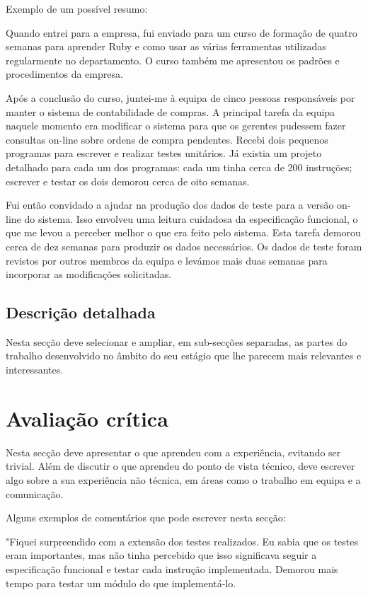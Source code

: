 \documentclass{article}
\begin{document}
Exemplo de um possível resumo:

Quando entrei para a empresa, fui enviado para um curso de formação de quatro semanas para aprender Ruby e como usar as várias ferramentas utilizadas regularmente no departamento. O curso também me apresentou os padrões e procedimentos da empresa.

Após a conclusão do curso, juntei-me à equipa de cinco pessoas responsáveis por manter o sistema de contabilidade de compras. A principal tarefa da equipa naquele momento era modificar o sistema para que os gerentes pudessem fazer consultas on-line sobre ordens de compra pendentes. Recebi dois pequenos programas para escrever e realizar testes unitários. Já existia um projeto detalhado para cada um dos programas: cada um tinha cerca de 200 instruções; escrever e testar os dois demorou cerca de oito semanas.

Fui então convidado a ajudar na produção dos dados de teste para a versão on-line do sistema. Isso envolveu uma leitura cuidadosa da especificação funcional, o que me levou a perceber melhor o que era feito pelo sistema. Esta tarefa demorou cerca de dez semanas para produzir os dados necessários. Os dados de teste foram revistos por outros membros da equipa e levámos mais duas semanas para incorporar as modificações solicitadas.

\subsection{Descrição detalhada}
Nesta secção deve  selecionar e ampliar, em sub-secções separadas, as partes do trabalho desenvolvido no âmbito do seu estágio que lhe parecem mais relevantes e interessantes.

\cleardoublepage
\section{Avaliação crítica}
\label{sec:ava-crt}
Nesta secção deve apresentar o que aprendeu com a experiência, evitando ser trivial. Além de discutir o que aprendeu do ponto de vista técnico, deve escrever algo sobre a sua experiência não técnica, em áreas como o trabalho em equipa e a comunicação.

Alguns exemplos de comentários que pode escrever nesta secção:

"Fiquei surpreendido com a extensão dos testes realizados. Eu sabia que os testes eram importantes, mas não tinha percebido que isso significava seguir a especificação funcional e testar cada instrução implementada. Demorou mais tempo para testar um módulo do que  implementá-lo.
\end{document}
